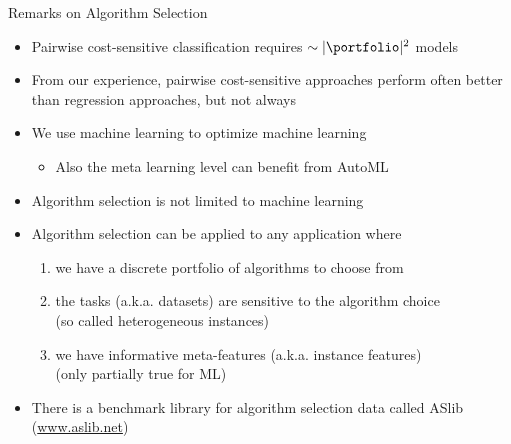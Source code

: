 \begin{frame}[c]{Remarks on Algorithm Selection}

\begin{itemize}
	\item Pairwise cost-sensitive classification requires $\sim |\portfolio|^2$ models
	\pause
	\item From our experience, pairwise cost-sensitive approaches perform often better than regression approaches, but not always
	\pause
	\item We use machine learning to optimize machine learning
	\begin{itemize}
		\item Also the meta learning level can benefit from AutoML\\ 
	\end{itemize}
	\pause
	\item Algorithm selection is not limited to machine learning
	\item Algorithm selection can be applied to any application where 
	\begin{enumerate}
		\pause
		\item we have a discrete portfolio of algorithms to choose from
		\pause
		\item the tasks (a.k.a. datasets) are sensitive to the algorithm choice\\ (so called heterogeneous instances)
		\pause
		\item we have informative meta-features (a.k.a. instance features)\\
		(only partially true for ML)
	\end{enumerate}
	\pause
	\item There is a benchmark library for algorithm selection data called ASlib (\url{www.aslib.net}) 
\end{itemize}

\end{frame}
